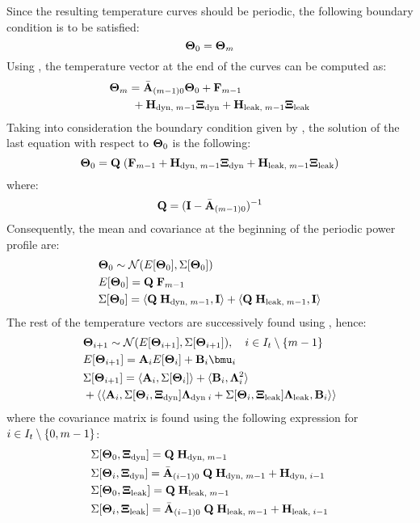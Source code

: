 Since the resulting temperature curves should be periodic, the following boundary condition is to be satisfied:
\begin{equation} \equlabel{dss-boundary}
  \vtemp_0 = \vtemp_{\stepcount}
\end{equation}
Using , the temperature vector at the end of the curves can be computed as:
\begin{align*}
  & \mathbf{\Theta}_{m} = \Bar{\mathbf{A}}_{(m - 1)0} \mathbf{\Theta}_0 + \mathbf{F}_{m - 1} \\
  & { } \qquad + \mathbf{H}_{\text{dyn}, \; m - 1} \mathbf{\Xi}_{\text{dyn}} + \mathbf{H}_{\text{leak}, \; m - 1} \mathbf{\Xi}_{\text{leak}}
\end{align*}
Taking into consideration the boundary condition given by , the solution of the last equation with respect to $\mathbf{\Theta}_0$ is the following:
\[
  \mathbf{\Theta}_0 = \mathbf{Q} \; (\mathbf{F}_{m - 1} + \mathbf{H}_{\text{dyn}, \; m - 1} \mathbf{\Xi}_{\text{dyn}} + \mathbf{H}_{\text{leak}, \; m - 1} \mathbf{\Xi}_{\text{leak}})
\]
where:
\begin{equation} \equlabel{q}
  \m{Q} = (\mone - \am{A}_{(\stepcount - 1)0})^{-1}
\end{equation}
Consequently, the mean and covariance at the beginning of the periodic power profile are:
\begin{align*}
  & \mathbf{\Theta}_0 \sim \mathcal{N}(E[\mathbf{\Theta}_0], \Sigma[\mathbf{\Theta}_0]) \\
  & E[\mathbf{\Theta}_0] = \mathbf{Q} \; \mathbf{F}_{m - 1} \\
  & \Sigma[\mathbf{\Theta}_0] = \langle \mathbf{Q} \; \mathbf{H}_{\text{dyn}, \; m - 1}, \mathbf{I} \rangle + \langle \mathbf{Q} \; \mathbf{H}_{\text{leak}, \; m - 1}, \mathbf{I} \rangle
\end{align*}
The rest of the temperature vectors are successively found using , hence:
\begin{align*}
  & \vtemp_{i + 1} \sim \normal(\expect{\vtemp_{i + 1}}, \cov{\vtemp_{i + 1}}), \sep i \in \timeindex \setminus \{\stepcount - 1\} \\
  & \expect{\vtemp_{i + 1}} = \m{A}_i \expect{\vtemp_i} + \m{B}_i \vmean{i} \\
  & \cov{\vtemp_{i + 1}} = \dbl{\m{A}_i, \cov{\vtemp_i}} + \dbl{\m{B}_i, \ddev{i}^2} \\
  & {} + \dbl{\dbl{\m{A}_i, \cov{\vtemp_i, \vnormal_\dyn} \ddev{\dyn \; i} + \cov{\vtemp_i, \vnormal_\leak} \ddev{\leak}, \m{B}_i}}
\end{align*}
where the covariance matrix is found using the following expression for $i \in I_t \setminus \{0, m - 1\}$:
\begin{align*}
  & \Sigma[\mathbf{\Theta}_0, \mathbf{\Xi}_{\text{dyn}}] = \mathbf{Q} \; \mathbf{H}_{\text{dyn}, \; m - 1} \\
  & \Sigma[\mathbf{\Theta}_i, \mathbf{\Xi}_{\text{dyn}}] = \Bar{\mathbf{A}}_{(i - 1)0} \; \mathbf{Q} \; \mathbf{H}_{\text{dyn}, \; m - 1} + \mathbf{H}_{\text{dyn}, \; i - 1} \\
  & \Sigma[\mathbf{\Theta}_0, \mathbf{\Xi}_{\text{leak}}] = \mathbf{Q} \; \mathbf{H}_{\text{leak}, \; m - 1} \\
  & \Sigma[\mathbf{\Theta}_i, \mathbf{\Xi}_{\text{leak}}] = \Bar{\mathbf{A}}_{(i - 1)0} \; \mathbf{Q} \; \mathbf{H}_{\text{leak}, \; m - 1} + \mathbf{H}_{\text{leak}, \; i - 1}
\end{align*}

